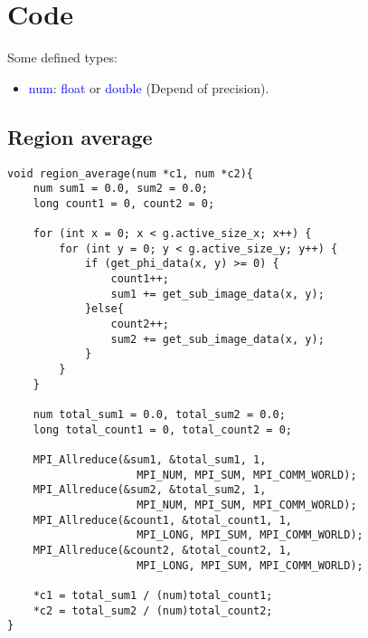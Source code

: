 \chapter{Code}

Some defined types:

\newcommand{\ck}[1]{\textcolor{blue}{#1}}
\begin{itemize}
    \item \ck{num}: \ck{float} or \ck{double} (Depend of precision).
\end{itemize}

\section{Region average}
\label{apdx:regionAverage}
\begin{lstlisting}[caption=Region average]
void region_average(num *c1, num *c2){
    num sum1 = 0.0, sum2 = 0.0;
    long count1 = 0, count2 = 0;
    
    for (int x = 0; x < g.active_size_x; x++) {
        for (int y = 0; y < g.active_size_y; y++) {
            if (get_phi_data(x, y) >= 0) {
                count1++;
                sum1 += get_sub_image_data(x, y);
            }else{
                count2++;
                sum2 += get_sub_image_data(x, y);
            }
        }
    }
    
    num total_sum1 = 0.0, total_sum2 = 0.0;
    long total_count1 = 0, total_count2 = 0;
    
    MPI_Allreduce(&sum1, &total_sum1, 1, 
                    MPI_NUM, MPI_SUM, MPI_COMM_WORLD);
    MPI_Allreduce(&sum2, &total_sum2, 1, 
                    MPI_NUM, MPI_SUM, MPI_COMM_WORLD);
    MPI_Allreduce(&count1, &total_count1, 1, 
                    MPI_LONG, MPI_SUM, MPI_COMM_WORLD);
    MPI_Allreduce(&count2, &total_count2, 1, 
                    MPI_LONG, MPI_SUM, MPI_COMM_WORLD);
    
    *c1 = total_sum1 / (num)total_count1;
    *c2 = total_sum2 / (num)total_count2;
}
\end{lstlisting}

